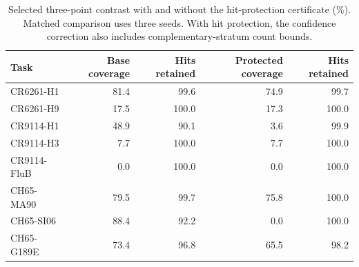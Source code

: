\begin{table}[t]
\centering\footnotesize
\caption{Selected three-point contrast with and without the hit-protection certificate (\%). Matched comparison uses three seeds. With hit protection, the confidence correction also includes complementary-stratum count bounds.}
\setlength{\tabcolsep}{4pt}
\begin{tabular}{lrrrr}
\toprule
Task & Base coverage & Hits retained & Protected coverage & Hits retained \\
\midrule
CR6261-H1 & 81.4 & 99.6 & 74.9 & 99.7 \\
CR6261-H9 & 17.5 & 100.0 & 17.3 & 100.0 \\
CR9114-H1 & 48.9 & 90.1 & 3.6 & 99.9 \\
CR9114-H3 & 7.7 & 100.0 & 7.7 & 100.0 \\
CR9114-FluB & 0.0 & 100.0 & 0.0 & 100.0 \\
CH65-MA90 & 79.5 & 99.7 & 75.8 & 100.0 \\
CH65-SI06 & 88.4 & 92.2 & 0.0 & 100.0 \\
CH65-G189E & 73.4 & 96.8 & 65.5 & 98.2 \\
\bottomrule
\end{tabular}
\end{table}
